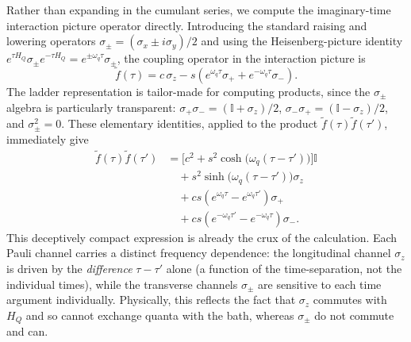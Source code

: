 Rather than expanding in the cumulant series, we compute the imaginary-time
interaction picture operator directly. Introducing the standard raising and
lowering operators $\sigma_\pm=(\sigma_x\pm i\sigma_y)/2$ and using the
Heisenberg-picture identity $e^{\tau H_Q}\sigma_\pm e^{-\tau H_Q}=e^{\pm\omega_q\tau}\sigma_\pm$,
the coupling operator in the interaction picture is
\begin{equation}
    \tilde{f}(\tau)
    = c\,\sigma_z - s\!\left(e^{\omega_q\tau}\sigma_+ + e^{-\omega_q\tau}\sigma_-\right).
    \label{eq:ftilde_sigma_pm_v5}
\end{equation}
The ladder representation is tailor-made for computing products, since the
$\sigma_\pm$ algebra is particularly transparent: $\sigma_+\sigma_-=(\mathbb{I}+\sigma_z)/2$,
$\sigma_-\sigma_+=(\mathbb{I}-\sigma_z)/2$, and $\sigma_\pm^2=0$. These
elementary identities, applied to the product $\tilde{f}(\tau)\tilde{f}(\tau')$,
immediately give
\begin{equation}
\begin{split}
    \tilde{f}(\tau)\tilde{f}(\tau')
    &= \Big[c^2+s^2\cosh\!\big(\omega_q(\tau-\tau')\big)\Big]\mathbb{I} \\
    &\quad + s^2\sinh\!\big(\omega_q(\tau-\tau')\big)\sigma_z \\
    &\quad + cs\!\left(e^{\omega_q\tau}-e^{\omega_q\tau'}\right)\sigma_+ \\
    &\quad + cs\!\left(e^{-\omega_q\tau'}-e^{-\omega_q\tau}\right)\sigma_-.
\end{split}
\label{eq:ff_product_sigma_pm_v5}
\end{equation}
This deceptively compact expression is already the crux of the calculation.
Each Pauli channel carries a distinct frequency dependence: the longitudinal
channel $\sigma_z$ is driven by the \emph{difference} $\tau-\tau'$ alone (a
function of the time-separation, not the individual times), while the transverse
channels $\sigma_\pm$ are sensitive to each time argument individually. 
Physically, this reflects the fact that $\sigma_z$ commutes with $H_Q$ and
so cannot exchange quanta with the bath, whereas $\sigma_\pm$ do not commute
and can.


